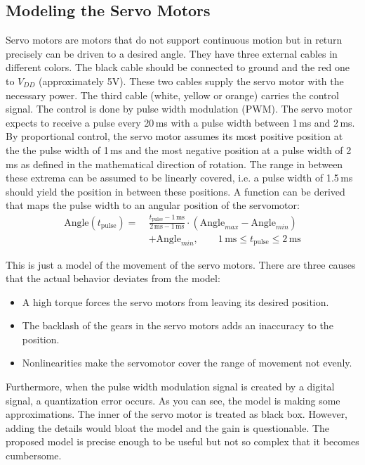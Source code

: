 \documentclass{sig-alternate-05-2015}
\begin{document}
\subsection{Modeling the Servo Motors}
Servo motors are motors that do not support continuous motion but in return precisely can be driven to a desired angle. They have three external cables in different colors. The black cable should be connected to ground and the red one to $V_{DD}$ (approximately 5V). These two cables supply the servo motor with the necessary power. The third cable (white, yellow or orange) carries the control signal. The control is done by pulse width modulation (PWM). The servo motor expects to receive a pulse every 20\,ms with a pulse width between 1\,ms and 2\,ms. By proportional control, the servo motor assumes its most positive position at the the pulse width of 1\,ms and the most negative position at a pulse width of 2\,ms as defined in the mathematical direction of rotation. The range in between these extrema can be assumed to be linearly covered, i.e. a pulse width of 1.5\,ms should yield the position in between these positions. A function can be derived that maps the pulse width to an angular position of the servomotor:
\begin{align*}
	\text{Angle}(t_\text{pulse}) =~& \frac{t_\text{pulse} -1\,\text{ms} }{2\,\text{ms}-1\,\text{ms}}\cdot \left(\text{Angle}_{max}-\text{Angle}_{min}\right) \\ & + \text{Angle}_{min}, \qquad 1\,\text{ms} \le t_\text{pulse}\le 2\,\text{ms}
\end{align*}

This is just a model of the movement of the servo motors. There are three causes that the actual behavior deviates from the model:
\begin{itemize}
	\item A high torque forces the servo motors from leaving its desired position.
	\item The backlash of the gears in the servo motors adds an inaccuracy to the position.
	\item Nonlinearities make the servomotor cover the range of movement not evenly.
\end{itemize}
Furthermore, when the pulse width modulation signal is created by a digital signal, a quantization error occurs.
As you can see, the model is making some approximations. The inner of the servo motor is treated as black box. However, adding the details would bloat the model and the gain is questionable. The proposed model is precise enough to be useful but not so complex that it becomes cumbersome.
\end{document}
